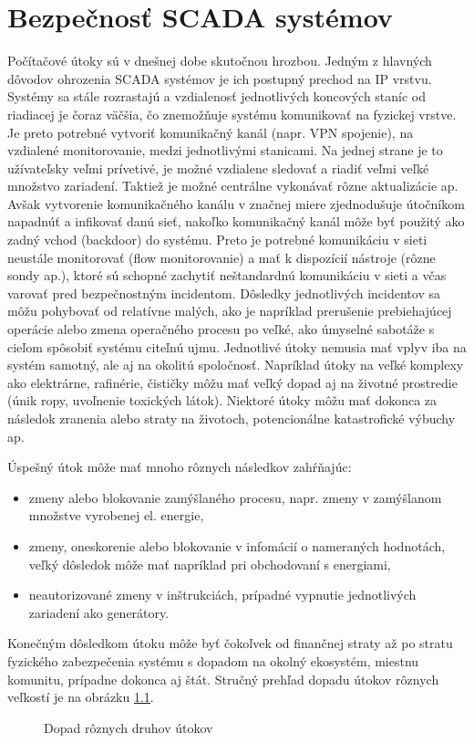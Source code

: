 \chapter{Bezpečnosť SCADA systémov}
\label{bezpecnost}
\tab Počítačové útoky sú v dnešnej dobe skutočnou hrozbou. Jedným z hlavných dôvodov ohrozenia SCADA systémov je ich postupný prechod na IP vrstvu. Systémy sa stále rozrastajú a vzdialenosť jednotlivých koncových staníc od riadiacej je čoraz väčšia, čo znemožňuje systému komunikovať na fyzickej vrstve. Je preto potrebné vytvoriť komunikačný kanál (napr. VPN spojenie), na vzdialené monitorovanie, medzi jednotlivými stanicami. Na jednej strane je to užívateľsky veľmi prívetivé, je možné vzdialene sledovať a riadiť veľmi veľké množstvo zariadení. Taktiež je možné centrálne vykonávať rôzne aktualizácie ap. Avšak vytvorenie komunikačného kanálu v značnej miere zjednodušuje útočníkom napadnúť a infikovať danú sieť, nakoľko komunikačný kanál môže byť použitý ako zadný vchod (backdoor) do systému. Preto je potrebné komunikáciu v sieti neustále monitorovať (flow monitorovanie) a mať k dispozícií nástroje (rôzne sondy ap.), ktoré sú schopné zachytiť neštandardnú komunikáciu v sieti a včas varovať pred bezpečnostným incidentom. Dôsledky jednotlivých incidentov sa môžu pohybovať od relatívne malých, ako je napríklad prerušenie prebiehajúcej operácie alebo zmena operačného procesu po veľké, ako úmyselné sabotáže s cieľom spôsobiť systému citeľnú ujmu. Jednotlivé útoky nemusia mať vplyv iba na systém samotný, ale aj na okolitú spoločnosť. Napríklad útoky na veľké komplexy ako elektrárne, rafinérie, čističky môžu mať veľký dopad aj na životné prostredie (únik ropy, uvoľnenie toxických látok). Niektoré útoky môžu mať dokonca za následok zranenia alebo straty na životoch, potencionálne katastrofické výbuchy ap\cite{Security}. \par
Úspešný útok môže mať mnoho rôznych následkov zahŕňajúc:
\begin{itemize}
\item zmeny alebo blokovanie zamýšlaného procesu, napr. zmeny v zamýšlanom množstve vyrobenej el. energie,
\item zmeny, oneskorenie alebo blokovanie v infomácií o nameraných hodnotách, veľký dôsledok môže mať napríklad pri obchodovaní s energiami,
\item neautorizované zmeny v inštrukciách, prípadné vypnutie jednotlivých zariadení ako generátory.
\end{itemize}
Konečným dôsledkom útoku môže byť čokoľvek od finančnej straty až po stratu fyzického zabezpečenia systému s dopadom na okolný ekosystém, miestnu komunitu, prípadne dokonca aj štát. Stručný prehľad dopadu útokov rôznych veľkostí je na obrázku \ref{attackcons}.
\begin{figure}[h]
    \centering
    \caption{Dopad rôznych druhov útokov\cite{Security}}
\label{attackcons}
\end{figure}

